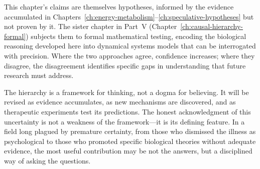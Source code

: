 This chapter's claims are themselves hypotheses, informed by the evidence accumulated in Chapters~\ref{ch:energy-metabolism}--\ref{ch:speculative-hypotheses} but not proven by it. The sister chapter in Part~V (Chapter~\ref{ch:causal-hierarchy-formal}) subjects them to formal mathematical testing, encoding the biological reasoning developed here into dynamical systems models that can be interrogated with precision. Where the two approaches agree, confidence increases; where they disagree, the disagreement identifies specific gaps in understanding that future research must address.

The hierarchy is a framework for thinking, not a dogma for believing. It will be revised as evidence accumulates, as new mechanisms are discovered, and as therapeutic experiments test its predictions. The honest acknowledgment of this uncertainty is not a weakness of the framework---it is its defining feature. In a field long plagued by premature certainty, from those who dismissed the illness as psychological to those who promoted specific biological theories without adequate evidence, the most useful contribution may be not the answers, but a disciplined way of asking the questions.
